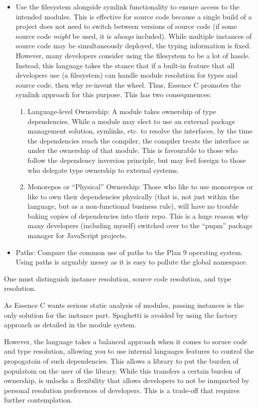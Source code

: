 \documentclass[12pt,a4paper,twoside]{report}
\begin{document}
\begin{itemize}
\item Use the filesystem alongside symlink functionality to ensure access to the intended modules. This is effective for source code because a single build of a project does not need to switch between versions of source code (if some source code \textit{might} be used, it is \textit{always} included). While multiple instances of source code may be simultaneously deployed, the typing information is fixed. However, many developers consider using the filesystem to be a lot of hassle. Instead, this language takes the stance that if a built-in feature that all developers use (a filesystem) can handle module resolution for types and source code, then why re-invent the wheel. Thus, Essence C promotes the symlink approach for this purpose. This has two consequnences:
\begin{enumerate}
  \item Language-level Ownership: A module takes ownership of type dependencies. While a module may elect to use an external package management solution, symlinks, etc. to resolve the interfaces, by the time the dependencies reach the compiler, the compiler treats the interface as under the ownership of that module. This is favourable to those who follow the dependency inversion principle, but may feel foreign to those who delegate type ownership to external systems.
  \item Monorepos or ``Physical'' Ownership: Those who like to use monorepos or like to own their dependencies physically (that is, not just within the language, but as a non-functional business rule), will have no trouble baking copies of dependencies into their repo. This is a huge reason why many developers (including myself) switched over to the ``pnpm'' package manager for JavaScript projects.
\end{enumerate}
\item Paths: Compare the common use of paths to the Plan 9 operating system. Using paths is arguably messy as it is easy to pollute the global namespace.
\end{itemize}

One must distinguish instance resolution, source code resolution, and type resolution.

As Essence C wants serious static analysis of modules, passing instances is the only solution for the instance part. Spaghetti is avoided by using the factory approach as detailed in the module system.

However, the language takes a balanced approach when it comes to soruce code and type resolution, allowing you to use internal languages features to control the propogatoin of such dependencies. This allows a library to put the burden of populatoin on the user of the library. While this transfers a certain burden of ownership, is unlocks a flexibility that allows developers to not be inmpacted by personal resolution preferences of developers. This is a trade-off that requires further contemplation.
\end{document}
